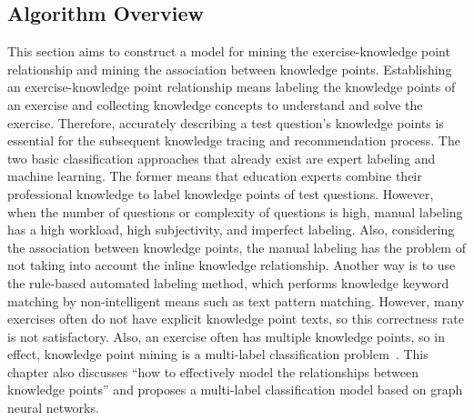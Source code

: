 \subsection{Algorithm Overview}

This section aims to construct a model for mining the exercise-knowledge point relationship and mining the association between knowledge points. Establishing an exercise-knowledge point relationship means labeling the knowledge points of an exercise and collecting knowledge concepts to understand and solve the exercise. Therefore, accurately describing a test question's knowledge points is essential for the subsequent knowledge tracing and recommendation process. The two basic classification approaches that already exist are expert labeling and machine learning. The former means that education experts combine their professional knowledge to label knowledge points of test questions. However, when the number of questions or complexity of questions is high, manual labeling has a high workload, high subjectivity, and imperfect labeling. Also, considering the association between knowledge points, the manual labeling has the problem of not taking into account the inline knowledge relationship. Another way is to use the rule-based automated labeling method, which performs knowledge keyword matching by non-intelligent means such as text pattern matching. However, many exercises often do not have explicit knowledge point texts, so this correctness rate is not satisfactory. Also, an exercise often has multiple knowledge points, so in effect, knowledge point mining is a multi-label classification problem~\cite{tsoumakas2007multi,zhang2013review,liu2020emerging}. This chapter also discusses ``how to effectively model the relationships between knowledge points'' and proposes a multi-label classification model based on graph neural networks.


